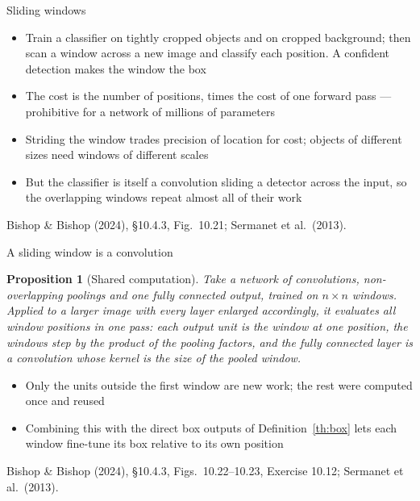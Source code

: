 \documentclass[aspectratio=169, 11pt]{beamer}
\newtheorem{propx}[theorem]{Proposition}
\newcommand{\srcline}[1]{%
  \par\vspace{0.25em}%
  {\scriptsize\color{mcMuted}\hfill #1\par}}
\newcommand{\src}[3]{}      %
\begin{document}
\begin{frame}{Sliding windows}
  \src{bishop2024}{section}{10.4.3}
  \src{sermanet2014}{section}{3.5}
  \vspace{0.1em}
  {\footnotesize
  \begin{itemize}\itemsep0.30em
    \item Train a classifier on tightly cropped objects and on cropped
          background; then \alert{scan} a window across a new image and
          classify each position. A confident detection makes the
          window the box
    \item The cost is the number of positions, times the cost of one
          forward pass --- prohibitive for a network of millions of
          parameters
    \item Striding the window trades precision of location for cost;
          objects of different sizes need windows of different scales
    \item But the classifier is itself a convolution sliding a detector
          across the input, so the overlapping windows repeat almost
          all of their work
  \end{itemize}}
  \srcline{Bishop \& Bishop (2024), \S10.4.3, Fig.~10.21; Sermanet et al.\ (2013).}
\end{frame}

\begin{frame}{A sliding window is a convolution}
  \src{bishop2024}{section}{10.4.3}
  \src{sermanet2014}{section}{3.5}
  \vspace{-0.3em}
  \begin{propx}[Shared computation]\label{th:slide}
    \small
    Take a network of convolutions, non-overlapping poolings and one
    fully connected output, trained on $n \times n$ windows. Applied to
    a larger image with every layer enlarged accordingly, it evaluates
    all window positions in one pass: each output unit is the window
    at one position, the windows step by the product of the pooling
    factors, and the fully connected layer is a convolution whose
    kernel is the size of the pooled window.
  \end{propx}
  \vspace{0.15em}
  {\footnotesize
  \begin{itemize}\itemsep0.22em
    \item Only the units outside the first window are new work; the
          rest were computed once and reused
    \item Combining this with the direct box outputs of
          Definition~\ref{th:box} lets each window fine-tune its box
          relative to its own position
  \end{itemize}}
  \srcline{Bishop \& Bishop (2024), \S10.4.3, Figs.~10.22--10.23,
  Exercise 10.12; Sermanet et al.\ (2013).}
\end{frame}
\end{document}
